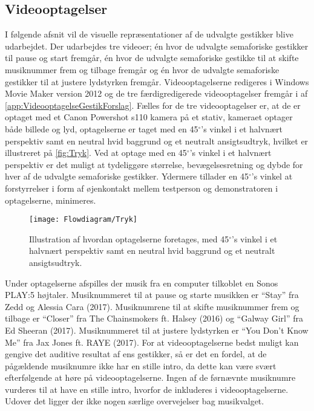 \subsection{Videooptagelser}
\label{VideooptagelserValgAfGestikker}
%
I følgende afsnit vil de visuelle repræsentationer af de udvalgte gestikker blive udarbejdet. Der udarbejdes tre videoer; én hvor de udvalgte semaforiske gestikker til pause og start fremgår, én hvor de udvalgte semaforiske gestikke til at skifte musiknummer frem og tilbage fremgår og én hvor de udvalgte semaforiske gestikker til at justere lydstyrken fremgår. Videooptagelserne redigeres i Windows Movie Maker version 2012 og de tre færdigredigerede videooptagelser fremgår i af \autoref{app:VideooptagelseGestikForslag}.\blankline
%
Fælles for de tre videooptagelser er, at de er optaget med et Canon Powershot s110 kamera på et stativ, kameraet optager både billede og lyd, optagelserne er taget med en 45$^{\circ}$'s vinkel i et halvnært perspektiv samt en neutral hvid baggrund og et neutralt ansigtsudtryk, hvilket er illustreret på \autoref{fig:Tryk}. Ved at optage med en 45$^{\circ}$'s vinkel i et halvnært perspektiv er det muligt at tydeliggøre størrelse, bevægelsesretning og dybde for hver af de udvalgte semaforiske gestikker. Ydermere tillader en 45$^{\circ}$'s vinkel at forstyrrelser i form af øjenkontakt mellem testperson og demonstratoren i optagelserne, minimeres. 
%
\begin{figure}[H]
	\centering
	\texttt{[image: Flowdiagram/Tryk]}
	\caption{Illustration af hvordan optagelserne foretages, med 45$^{\circ}$'s vinkel i et halvnært perspektiv samt en neutral hvid baggrund og et neutralt ansigtsudtryk.}
	\label{fig:Tryk}
\end{figure}
\noindent
%
Under optagelserne afspilles der musik fra en computer tilkoblet en Sonos PLAY:5 højtaler. Musiknummeret til at pause og starte musikken er \enquote{Stay} fra Zedd og Alessia Cara (2017). Musiknumrene til at skifte musiknummer frem og tilbage er \enquote{Closer} fra The Chainsmokers ft. Halsey (2016) og \enquote{Galway Girl} fra Ed Sheeran (2017). Musiknummeret til at justere lydstyrken er \enquote{You Don't Know Me} fra Jax Jones ft. RAYE (2017). For at videooptagelserne bedst muligt kan gengive det auditive resultat af ens gestikker, så er det en fordel, at de pågældende musiknumre ikke har en stille intro, da dette kan være svært efterfølgende at høre på videooptagelserne. Ingen af de førnævnte musiknumre vurderes til at have en stille intro, hvorfor de inkluderes i videooptagelserne. Udover det ligger der ikke nogen særlige overvejelser bag musikvalget. 

